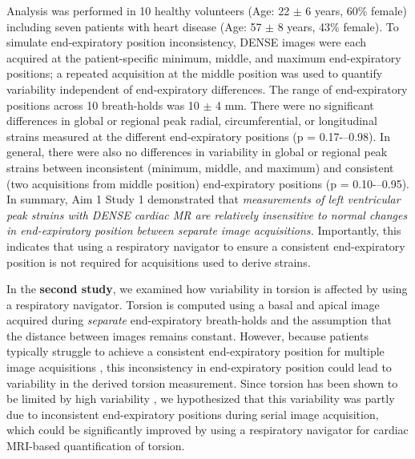 	Analysis was performed in 10 healthy volunteers (Age: 22 $\pm$ 6 years, 60\% female) including seven patients with heart disease (Age: 57 $\pm$ 8 years, 43\% female). To simulate end-expiratory position inconsistency, DENSE images were each acquired at the patient-specific minimum, middle, and maximum end-expiratory positions; a repeated acquisition at the middle position was used to quantify variability independent of end-expiratory differences. The range of end-expiratory positions across 10 breath-holds was 10 $\pm$ 4 mm. There were no significant differences in global or regional peak radial, circumferential, or longitudinal strains measured at the different end-expiratory positions (p = 0.17-–0.98). In general, there were also no differences in variability in global or regional peak strains between inconsistent (minimum, middle, and maximum) and consistent (two acquisitions from middle position) end-expiratory positions (p = 0.10-–0.95). In summary, Aim 1 Study 1 demonstrated that \textit{measurements of left ventricular peak strains with DENSE cardiac MR are relatively insensitive to normal changes in end-expiratory position between separate image acquisitions.} Importantly, this indicates that using a respiratory navigator to ensure a consistent end-expiratory position is not required for acquisitions used to derive strains.

	In the \textbf{second study}, we examined how variability in torsion is affected by using a respiratory navigator. Torsion is computed using a basal and apical image acquired during \textit{separate} end-expiratory breath-holds and the assumption that the distance between images remains constant. However, because patients typically struggle to achieve a consistent end-expiratory position for multiple image acquisitions \cite{Liu1993,Wang1995a,Taylor1997a,Holland1998c,Fischer2006a}, this inconsistency in end-expiratory position could lead to variability in the derived torsion measurement. Since torsion has been shown to be limited by high variability \cite{Donekal2013a}, we hypothesized that this variability was partly due to inconsistent end-expiratory positions during serial image acquisition, which could be significantly improved by using a respiratory navigator for cardiac MRI-based quantification of torsion.

